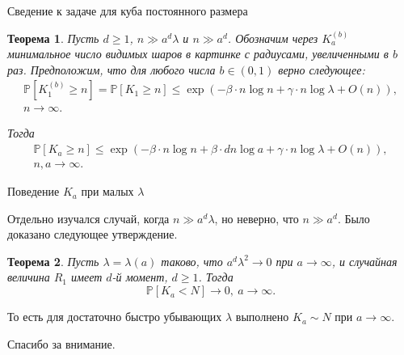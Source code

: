 \documentclass{beamer}
\theoremstyle{plain}
\newtheorem{thm}{Теорема} %
\theoremstyle{definition}
\theoremstyle{remark}
\def\geq{\geqslant}
\def\leq{\leqslant}
\newcommand{\PP}{\mathbb{P}}
\begin{document}
\begin{frame}{Сведение к задаче для куба постоянного размера}

\begin{thm}
    Пусть $d\geq 1$,  $n \gg a^d\lambda$ и $n \gg a^d$. Обозначим через $K_a^{(b)}$ минимальное число видимых шаров в картинке с радиусами, увеличенными в $b$ раз.
Предположим, что для любого числа $b \in (0, 1)$ верно следующее:
\begin{multline*}
    \PP[K_1^{(b)} \geq n] =\PP[K_1 \geq n] \leq \exp \left(-\beta\cdot n\log n + \gamma\cdot n\log\lambda + O(n)\right),\\  n \to \infty.
\end{multline*}
    


Тогда 
\begin{multline*}
    \PP[K_a \geq n] \leq \exp \left(-\beta\cdot n\log n + \beta\cdot dn\log a + \gamma\cdot n\log\lambda + O(n)\right),\\  n, a \to \infty.
\end{multline*}{}
\end{thm}
    
\end{frame}

\begin{frame}{Поведение $K_a$ при малых $\lambda$}

Отдельно изучался случай, когда $n\gg a^d\lambda$, но неверно, что $n\gg a^d$. Было доказано следующее утверждение.

\begin{thm}
    Пусть $\lambda = \lambda(a)$ таково, что $a^d\lambda^2 \to 0$ при $a\to\infty$, и случайная величина $R_1$ имеет $d$-й момент, $d\geq 1$. Тогда $$\PP[K_a < N] \to 0, \  a\to\infty.$$
\end{thm}

То есть для достаточно быстро убывающих $\lambda$ выполнено $K_a \sim N$ при $a\to\infty$.
    
\end{frame}


\begin{frame}
\begin{center}
\Huge Спасибо за внимание.
\end{center}
\end{frame}
\end{document}
